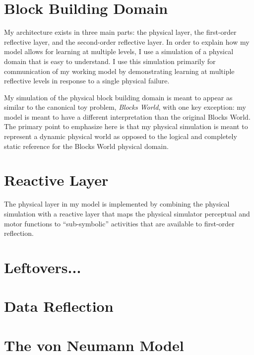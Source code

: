 \section{Block Building Domain}

My architecture exists in three main parts: the physical layer, the
first-order reflective layer, and the second-order reflective layer.
In order to explain how my model allows for learning at multiple
levels, I use a simulation of a physical domain that is easy to
understand.  I use this simulation primarily for communication of my
working model by demonstrating learning at multiple reflective levels
in response to a single physical failure.

My simulation of the physical block building domain is meant to appear
as similar to the canonical toy problem, \emph{Blocks World}, with one
key exception: my model is meant to have a different interpretation
than the original Blocks World.  The primary point to emphasize here
is that my physical simulation is meant to represent a dynamic
physical world as opposed to the logical and completely static
reference for the Blocks World physical domain.



\section{Reactive Layer}

The physical layer in my model is implemented by combining the
physical simulation with a reactive layer that maps the physical
simulator perceptual and motor functions to ``sub-symbolic''
activities that are available to first-order reflection.



\section{Leftovers...}

\section{Data Reflection}



\section{The von Neumann Model}


